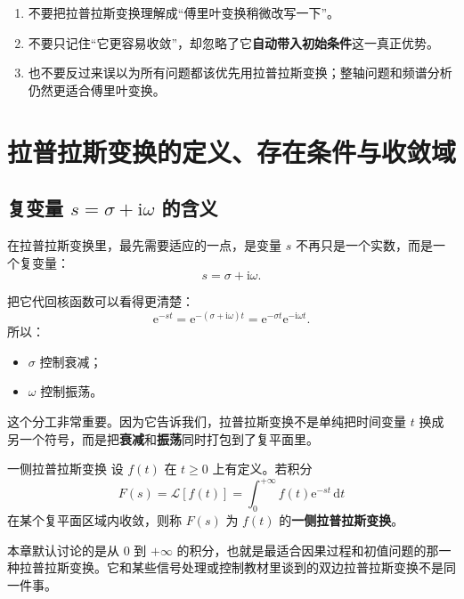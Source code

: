 \begin{jinshi}[这一节最容易形成的误解]
\begin{enumerate}
    \item 不要把拉普拉斯变换理解成``傅里叶变换稍微改写一下''。
    \item 不要只记住``它更容易收敛''，却忽略了它\textbf{自动带入初始条件}这一真正优势。
    \item 也不要反过来误以为所有问题都该优先用拉普拉斯变换；整轴问题和频谱分析仍然更适合傅里叶变换。
\end{enumerate}
\end{jinshi}

\section{拉普拉斯变换的定义、存在条件与收敛域}

\subsection{\texorpdfstring{复变量 $s=\sigma+\mathrm{i}\omega$ 的含义}{复变量 s 的含义}}

在拉普拉斯变换里，最先需要适应的一点，是变量 $s$ 不再只是一个实数，而是一个复变量：
\[
    s=\sigma+\mathrm{i}\omega.
\]

把它代回核函数可以看得更清楚：
\[
    \mathrm{e}^{-st}
    =
    \mathrm{e}^{-(\sigma+\mathrm{i}\omega)t}
    =
    \mathrm{e}^{-\sigma t}\mathrm{e}^{-\mathrm{i}\omega t}.
\]
所以：
\begin{itemize}
    \item $\sigma$ 控制衰减；
    \item $\omega$ 控制振荡。
\end{itemize}

这个分工非常重要。因为它告诉我们，拉普拉斯变换不是单纯把时间变量 $t$ 换成另一个符号，而是把\textbf{衰减}和\textbf{振荡}同时打包到了复平面里。

\begin{dingliyi}{一侧拉普拉斯变换}{}
设 $f(t)$ 在 $t\ge 0$ 上有定义。若积分
\[
    F(s)=\mathcal{L}[f(t)]
    =
    \int_0^{+\infty} f(t)\mathrm{e}^{-st}\,\mathrm{d}t
\]
在某个复平面区域内收敛，则称 $F(s)$ 为 $f(t)$ 的\textbf{一侧拉普拉斯变换}。
\end{dingliyi}

\begin{tishi}[为什么这里强调``一侧'']
本章默认讨论的是从 $0$ 到 $+\infty$ 的积分，也就是最适合因果过程和初值问题的那一种拉普拉斯变换。它和某些信号处理或控制教材里谈到的双边拉普拉斯变换不是同一件事。
\end{tishi}

